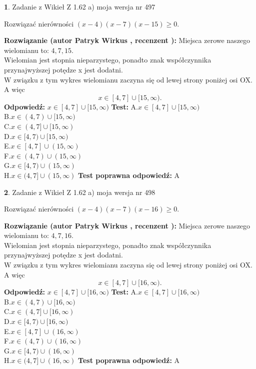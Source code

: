 \documentclass[12pt, a4paper]{article}
\theoremstyle{definition} %
\newtheorem{zad}{}
\newcommand{\zadStart}[1]{\begin{zad}#1\newline}
\newcommand{\zadStop}{\end{zad}}
\newcommand{\rozwStart}[2]{\noindent \textbf{Rozwiązanie (autor #1 , recenzent #2): }\newline}
\newcommand{\rozwStop}{\newline}
\newcommand{\odpStart}{\noindent \textbf{Odpowiedź:}\newline}
\newcommand{\odpStop}{\newline}
\newcommand{\testStart}{\noindent \textbf{Test:}\newline}
\newcommand{\testStop}{\newline}
\newcommand{\kluczStart}{\noindent \textbf{Test poprawna odpowiedź:}\newline}
\newcommand{\kluczStop}{\newline}
\begin{document}
\zadStart{Zadanie z Wikieł Z 1.62 a) moja wersja nr 497}

Rozwiązać nierówności $(x-4)(x-7)(x-15)\ge0$.
\zadStop
\rozwStart{Patryk Wirkus}{}
Miejsca zerowe naszego wielomianu to: $4, 7, 15$.\\
Wielomian jest stopnia nieparzystego, ponadto znak współczynnika przy\linebreak najwyższej potędze x jest dodatni.\\ W związku z tym wykres wielomianu zaczyna się od lewej strony poniżej osi OX. A więc $$x \in [4,7] \cup [15,\infty).$$
\rozwStop
\odpStart
$x \in [4,7] \cup [15,\infty)$
\odpStop
\testStart
A.$x \in [4,7] \cup [15,\infty)$\\
B.$x \in (4,7) \cup [15,\infty)$\\
C.$x \in (4,7] \cup [15,\infty)$\\
D.$x \in [4,7) \cup [15,\infty)$\\
E.$x \in [4,7] \cup (15,\infty)$\\
F.$x \in (4,7) \cup (15,\infty)$\\
G.$x \in [4,7) \cup (15,\infty)$\\
H.$x \in (4,7] \cup (15,\infty)$
\testStop
\kluczStart
A
\kluczStop



\zadStart{Zadanie z Wikieł Z 1.62 a) moja wersja nr 498}

Rozwiązać nierówności $(x-4)(x-7)(x-16)\ge0$.
\zadStop
\rozwStart{Patryk Wirkus}{}
Miejsca zerowe naszego wielomianu to: $4, 7, 16$.\\
Wielomian jest stopnia nieparzystego, ponadto znak współczynnika przy\linebreak najwyższej potędze x jest dodatni.\\ W związku z tym wykres wielomianu zaczyna się od lewej strony poniżej osi OX. A więc $$x \in [4,7] \cup [16,\infty).$$
\rozwStop
\odpStart
$x \in [4,7] \cup [16,\infty)$
\odpStop
\testStart
A.$x \in [4,7] \cup [16,\infty)$\\
B.$x \in (4,7) \cup [16,\infty)$\\
C.$x \in (4,7] \cup [16,\infty)$\\
D.$x \in [4,7) \cup [16,\infty)$\\
E.$x \in [4,7] \cup (16,\infty)$\\
F.$x \in (4,7) \cup (16,\infty)$\\
G.$x \in [4,7) \cup (16,\infty)$\\
H.$x \in (4,7] \cup (16,\infty)$
\testStop
\kluczStart
A
\kluczStop
\end{document}
